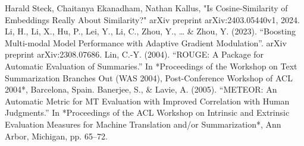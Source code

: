 \documentclass[conference]{IEEEtran}
\begin{document}
\begin{thebibliography}{9}
     Harald Steck, Chaitanya Ekanadham, Nathan Kallus, "Is Cosine-Similarity of Embeddings Really About Similarity?" arXiv preprint arXiv:2403.05440v1, 2024.
     Li, H., Li, X., Hu, P., Lei, Y., Li, C., Zhou, Y., … \& Zhou, Y. (2023). ``Boosting Multi-modal Model Performance with Adaptive Gradient Modulation''. arXiv preprint arXiv:2308.07686.
     Lin, C.-Y. (2004). ``ROUGE: A Package for Automatic Evaluation of Summaries.'' In *Proceedings of the Workshop on Text Summarization Branches Out (WAS 2004), Post-Conference Workshop of ACL 2004*, Barcelona, Spain.
     Banerjee, S., \& Lavie, A. (2005). ``METEOR: An Automatic Metric for MT Evaluation with Improved Correlation with Human Judgments.'' In *Proceedings of the ACL Workshop on Intrinsic and Extrinsic Evaluation Measures for Machine Translation and/or Summarization*, Ann Arbor, Michigan, pp. 65--72.
\end{thebibliography}
\end{document}
